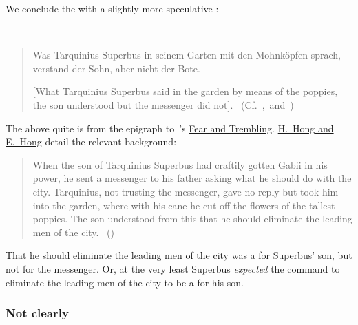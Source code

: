 \begin{note}[Poppies]
  We conclude the  with a slightly more speculative :
  \begin{illustration}[Poppies]
    \mbox{ }
    \vspace{-\baselineskip}
    \begin{quote}
      Was Tarquinius Superbus in seinem Garten mit den Mohnköpfen sprach, verstand der Sohn, aber nicht der Bote.

      [What Tarquinius Superbus said in the garden by means of the poppies, the son understood but the messenger did not].\newline
    \mbox{ }\hfill\mbox{(Cf.~\cite[3]{Kierkegaard:1983ta}, and~\cite[190]{Hamann:1822vp})}
  \end{quote}
  \vspace{-\baselineskip}
  \end{illustration}
  The above quite is from the epigraph to~\citeauthor{Kierkegaard:1983ta}'s \hyperlink{cite.Kierkegaard:1983ta}{Fear and Trembling}.
  \hyperlink{cite.Kierkegaard:1983ta}{H.\ Hong and E.\ Hong} detail the relevant background:

  \begin{quote}
    When the son of Tarquinius Superbus had craftily gotten Gabii in his power, he sent a messenger to his father asking what he should do with the city.
    Tarquinius, not trusting the messenger, gave no reply but took him into the garden, where with his cane he cut off the flowers of the tallest poppies.
    The son understood from this that he should eliminate the leading men of the city.%
    \mbox{ }\hfill\mbox{(\citeyear[339]{Kierkegaard:1983ta})}
  \end{quote}
  That he should eliminate the leading men of the city was a  for Superbus' son, but not for the messenger.
  Or, at the very least Superbus \emph{expected} the command to eliminate the leading men of the city to be a \fc{} for his son.
\end{note}

\subsubsection{Not clearly }
\label{cha:fcs:sec:illu:no}

